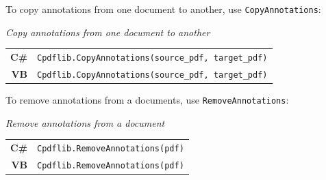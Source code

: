 \documentclass[a4paper]{memoir}
\begin{document}
To copy annotations from one document to another, use \verb!CopyAnnotations!:
\begin{framed}
\noindent\textit{Copy annotations from one document to another}

\vspace{2mm}
\noindent\begin{tabular}{rl}
\small\sffamily\textbf{C\#} &
\begin{minipage}{4in}
\small\verb!Cpdflib.CopyAnnotations(source_pdf, target_pdf)!
\end{minipage}\\[5mm]
\small\sffamily\textbf{VB} &
\begin{minipage}{4in}
\small\verb!Cpdflib.CopyAnnotations(source_pdf, target_pdf)!
\end{minipage}\\[5mm]
\end{tabular}
\end{framed}

To remove annotations from a documents, use \verb!RemoveAnnotations!:
\begin{framed}
\noindent\textit{Remove annotations from a document}

\vspace{2mm}
\noindent\begin{tabular}{rl}
\small\sffamily\textbf{C\#} &
\begin{minipage}{4in}
\small\verb!Cpdflib.RemoveAnnotations(pdf)!
\end{minipage}\\[5mm]
\small\sffamily\textbf{VB} &
\begin{minipage}{4in}
\small\verb!Cpdflib.RemoveAnnotations(pdf)!
\end{minipage}\\[5mm]
\end{tabular}
\end{framed}
\end{document}
